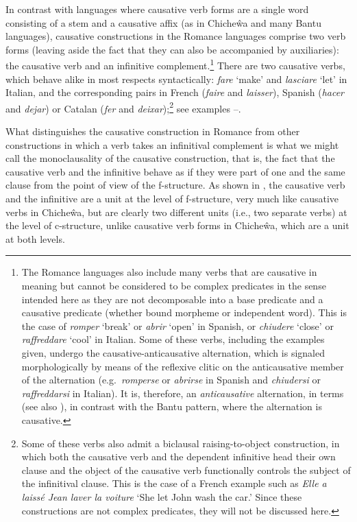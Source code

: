 \documentclass[output=paper,hidelinks]{langscibook}
\begin{document}
In contrast with languages where causative verb forms are a single word consisting of a stem and a causative affix (as in Chiche\^wa and many Bantu languages), causative constructions in the Romance languages comprise two verb forms (leaving aside the fact that they can also be accompanied by auxiliaries): the causative verb and an infinitive complement.\footnote{The Romance languages also include many verbs that are causative in meaning but cannot be considered to be complex predicates in the sense intended here as they are not decomposable into a base predicate and a causative predicate (whether bound morpheme or independent word). This is the case of \textit{romper} `break' or \textit{abrir} `open' in Spanish, or \textit{chiudere} `close' or \textit{raffreddare} `cool' in Italian. Some of these verbs, including the examples given, undergo the causative-anticausative alternation, which is signaled morphologically by means of the reflexive clitic on the anticausative member of the alternation (e.g.\ \textit{romperse} or \textit{abrirse} in Spanish and \textit{chiudersi} or \textit{raffreddarsi} in Italian). It is, therefore, an \textit{anticausative} alternation, in  terms (see also \citealt[971]{Cennamo2016}), in contrast with the Bantu pattern, where the alternation is causative.} There are two causative verbs, which behave alike in most respects syntactically: \textit{fare} `make' and \textit{lasciare} `let' in Italian, and the corresponding pairs in French (\textit{faire} and \textit{laisser}), Spanish (\textit{hacer} and \textit{dejar}) or Catalan (\textit{fer} and \textit{deixar});\footnote{Some of these verbs also admit a biclausal raising-to-object construction, in which both the causative verb and the dependent infinitive head their own clause and the object of the causative verb functionally controls the subject of the infinitival clause. This is the case of a French example such as \textit{Elle a laissé Jean laver la voiture} `She let John wash the car.' Since these constructions are not complex predicates, they will not be discussed here.} see examples --.

What distinguishes the causative construction in Romance from other constructions in which a verb takes an infinitival complement is what we might call the monoclausality of the causative construction, that is, the fact that the causative verb and the infinitive behave as if they were part of one and the same clause from the point of view of the f-structure. As shown in \citet{Alsina1997}, the causative verb and the infinitive are a unit at the level of f-structure, very much like causative verbs in Chiche\^wa, but are clearly two different units (i.e., two separate verbs) at the level of c-structure, unlike causative verb forms in Chiche\^wa, which are a unit at both levels.
\end{document}
